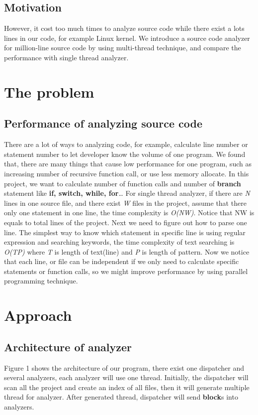 \documentclass{acm_proc_article-sp}
\begin{document}
\subsection{Motivation}
	However, it cost too much times to analyze source code while there
	exist a lots lines in our code, for example Linux kernel.
	We introduce a source code analyzer for million-line source code
	by using multi-thread technique, and compare the performance with 
	single thread analyzer.


\section{The problem}
\subsection{Performance of analyzing source code}
	There are a lot of ways to analyzing code, for example, calculate
	line number or statement number to let developer know the 
	volume of one program. We found that, there are many things that
	cause low performance for one program, such as increasing number 
	of recursive function call, or use less memory allocate.
	In this project, we want to calculate number of function calls and 
	number of \textbf{branch} statement like \textbf{if, switch, while, for}\ldots
	For single thread analyzer, if there are \textit{N} lines in one source file, 
	and there exist \textit{W} files in the project, assume that there only one 
	statement in one line, the time complexity is \textit{O(NW)}. Notice that
	NW is equals to total lines of the project.
	Next we need to figure out how to parse one line. The simplest way 
	to know which statement in specific line is using regular expression 
	and searching keywords, the time complexity of text searching is 
	\textit{O(TP)} where \textit{T} is length of text(line) and \textit{P} is length
	of pattern. Now we notice that each line, or file can be independent 
	if we only need to calculate specific statements or function calls, so
	we might improve performance by using parallel programming technique.

\section{Approach}
\subsection{Architecture of analyzer}
	Figure 1 shows the architecture of our program, there exist one dispatcher 
	and several analyzers, each analyzer will use one thread. Initially, the 
	dispatcher will scan all the project and create an index of all files, then
	it will generate multiple thread for analyzer. After generated thread, 
	dispatcher will send \textbf{block}s into analyzers.
\end{document}
